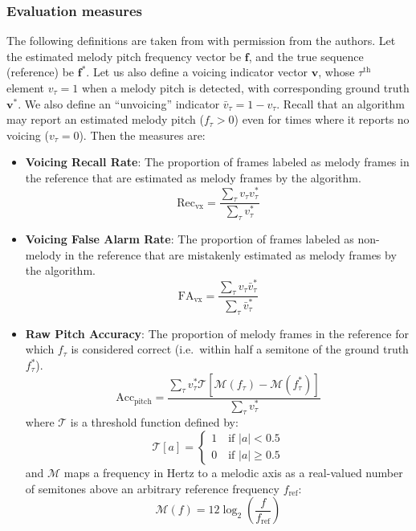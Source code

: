 \documentclass{article}
\begin{document}
\subsubsection{Evaluation measures}
The following definitions are taken from
\cite{salamon:MelodyReview:IEEESPM13} with permission from the authors. Let the estimated melody pitch frequency
vector be $\mathbf{f}$, and the true sequence (reference) be $\mathbf{f}^*$. Let
us also define a voicing indicator vector $\mathbf{v}$, whose $\tau^\text{th}$
element $v_\tau = 1$ when a melody pitch is detected, with corresponding ground
truth $\mathbf{v}^*$.  We also define an ``unvoicing'' indicator $\bar{v}_\tau =
1 - v_\tau$.  Recall that an algorithm may report an estimated melody pitch
($f_\tau > 0$) even for times where it reports no voicing ($v_\tau = 0$).   
Then the measures are:
\begin{itemize}
  \item \textbf{Voicing Recall Rate}: The proportion of frames labeled as
  melody frames in the reference that are estimated as melody frames by the
  algorithm.
\begin{equation}
\text{Rec}_\text{vx} = \frac{\sum_\tau v_\tau v^*_\tau}{\sum_\tau v^*_\tau}
\end{equation}

  \item \textbf{Voicing False Alarm Rate}: The proportion of frames
  labeled as non-melody in the reference that are mistakenly estimated as
  melody frames by the algorithm.
\begin{equation}
\text{FA}_\text{vx} = \frac{\sum_\tau v_\tau \bar{v}^*_\tau}{\sum_\tau \bar{v}^*_\tau}
\end{equation}

  \item \textbf{Raw Pitch Accuracy}: The proportion of melody frames in the
  reference for which $f_\tau$ is considered
  correct (i.e.~within half a semitone of the ground
  truth $f^*_\tau$).
\begin{equation}
\text{Acc}_\text{pitch}= \frac{\sum_\tau v^*_\tau \mathcal{T}\left[\mathcal{M}(f_\tau)-\mathcal{M}(f^*_\tau) \right] }{\sum_\tau v^*_\tau}
\end{equation}
where $\mathcal{T}$ is a threshold function defined by:
\begin{equation}
\mathcal{T}[a] = \begin{cases}
1 \quad \text{if } |a| < 0.5 \\
0 \quad \text{if } |a| \ge 0.5
\end{cases}
\end{equation}
and $\mathcal{M}$ maps a frequency in Hertz to a melodic 
axis as a real-valued number of semitones above an arbitrary
reference frequency $f_\text{ref}$:
\begin{equation}
\mathcal{M}(f) = 12 \log_2\left( \frac{f}{f_\text{ref}} \right)
\end{equation}


\end{itemize}
\end{document}
